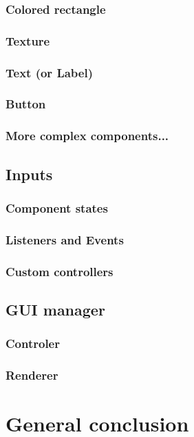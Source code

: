 \documentclass[11pt]{article}
\begin{document}
			\subsubsection{Colored rectangle}
			\subsubsection{Texture}
			\subsubsection{Text (or Label)}
			\subsubsection{Button}
			\subsubsection{More complex components...}

		\subsection{Inputs}
			\subsubsection{Component states}
			\subsubsection{Listeners and Events}
			\subsubsection{Custom controllers}

		\subsection{GUI manager}
			\subsubsection{Controler}
			\subsubsection{Renderer}

	\newpage
	
	\section{General conclusion}
	\newpage
	
	\nocite{*}
	
	
\end{document}
